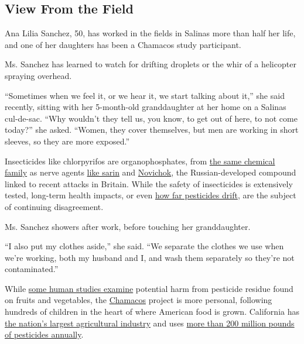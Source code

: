 \hypertarget{view-from-the-field}{%
\subsection{View From the Field}\label{view-from-the-field}}

Ana Lilia Sanchez, 50, has worked in the fields in Salinas more than
half her life, and one of her daughters has been a Chamacos study
participant.

Ms. Sanchez has learned to watch for drifting droplets or the whir of a
helicopter spraying overhead.

``Sometimes when we feel it, or we hear it, we start talking about it,''
she said recently, sitting with her 5-month-old granddaughter at her
home on a Salinas cul-de-sac. ``Why wouldn't they tell us, you know, to
get out of here, to not come today?'' she asked. ``Women, they cover
themselves, but men are working in short sleeves, so they are more
exposed.''

Insecticides like chlorpyrifos are organophosphates, from
\href{https://www.epa.gov/sites/production/files/documents/rmpp_6thed_ch5_organophosphates.pdf}{the
same chemical family} as nerve agents
\href{https://www.nytimes3xbfgragh.onion/2018/07/26/world/asia/japan-cult-execute-tokyo-subway-attack.html}{like
sarin} and
\href{https://www.nytimes3xbfgragh.onion/2018/03/13/world/europe/uk-russia-spy-poisoning.html}{Novichok},
the Russian-developed compound linked to recent attacks in Britain.
While the safety of insecticides is extensively tested, long-term health
impacts, or even
\href{https://www.nytimes3xbfgragh.onion/2017/09/21/business/monsanto-dicamba-weed-killer.html}{how
far pesticides drift}, are the subject of continuing disagreement.

Ms. Sanchez showers after work, before touching her granddaughter.

``I also put my clothes aside,'' she said. ``We separate the clothes we
use when we're working, both my husband and I, and wash them separately
so they're not contaminated.''

While \href{https://www.nature.com/articles/jes20177}{some human studies
examine} potential harm from pesticide residue found on fruits and
vegetables, the
\href{https://cerch.berkeley.edu/research-programs/chamacos-study}{Chamacos}
project is more personal, following hundreds of children in the heart of
where American food is grown. California has
\href{https://www.cdfa.ca.gov/Statistics/PDFs/2016-17AgReport.pdf}{the
nation's largest agricultural industry} and uses
\href{https://www.cdpr.ca.gov/docs/pur/pur16rep/16sum.htm\#pestuse}{more
than 200 million pounds of pesticides annually}.

